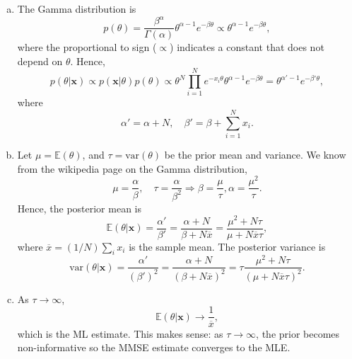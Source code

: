 \documentclass[11pt]{article}
\def\xbar{\overline{x}}
\def\arr{\rightarrow}
\def\Exp{\mathbb{E}}
\def\var{\mbox{var}}
\newcommand{\xbf}{\mathbf{x}}
\begin{document}
\begin{enumerate}
\begin{enumerate}[(a)]
\item The Gamma distribution is
\[
    p(\theta) = \frac{\beta^\alpha}{\Gamma(\alpha)}
        \theta^{\alpha-1}e^{-\beta \theta} \propto \theta^{\alpha-1}e^{-\beta \theta},
\]
where the proportional to sign ($\propto$) indicates
a constant that does not depend on $\theta$.
Hence,
\[
    p(\theta|\xbf) \propto p(\xbf|\theta)p(\theta)
        \propto \theta^N\prod_{i=1}^N e^{-x_i\theta}
        \theta^{\alpha-1}e^{-\beta \theta}
        = \theta^{\alpha'-1}e^{-\beta' \theta},
\]
where
\[
    \alpha' = \alpha + N, \quad \beta' = \beta + \sum_{i=1}^N x_i.
\]

\item Let $\mu=\Exp(\theta)$, and $\tau = \var(\theta)$ be the prior
mean and variance.  We know from the wikipedia page on the Gamma
distribution,
\[
    \mu = \frac{\alpha}{\beta}, \quad \tau = \frac{\alpha}{\beta^2}
    \Rightarrow \beta = \frac{\mu}{\tau}, 
    \alpha = \frac{\mu^2}{\tau}.
\]
Hence, the posterior mean is
\[
    \Exp(\theta|\xbf) = \frac{\alpha'}{\beta'}
    = \frac{\alpha + N}{\beta + N\xbar}
    = \frac{\mu^2 + N\tau}{\mu + N\xbar \tau},
\]
where $\xbar = (1/N)\sum_i x_i$ is the sample mean.
The posterior variance is 
\[
    \var(\theta|\xbf) = \frac{\alpha'}{(\beta')^2}
    = \frac{\alpha + N}{(\beta + N\xbar)^2}
    = \tau \frac{\mu^2 + N\tau}{(\mu + N\xbar \tau)^2}.
\]

\item As $\tau \arr \infty$, 
\[
    \Exp(\theta|\xbf) \rightarrow \frac{1}{\xbar}, 
\]
which is the ML estimate.  This makes sense:  as $\tau \arr \infty$,
the prior becomes non-informative so the MMSE estimate converges to 
the MLE.

\end{enumerate}

\end{enumerate}
\end{document}

